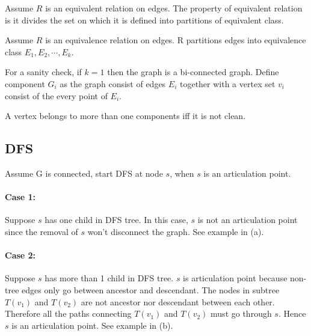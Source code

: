 \documentclass[en,hazy,blue,screen,14pt]{elegantnote}
\begin{document}
Assume $R$ is an equivalent relation on edges. The property of equivalent 
relation is it divides the set on which it is defined into partitions of 
equivalent class.

Assume $R$ is an equivalence relation on edges. R partitions edges into 
equivalence class $E_1, E_2, \cdots, E_k$. 

For a sanity check, if $k = 1$ then the graph is a bi-connected graph. 
Define component $G_i$ as the graph consist of edges $E_i$ together with a 
vertex set $v_i$ consist of the every point of $E_i$.

A vertex belongs to more than one components iff it is not clean.

\subsection{DFS }
Assume G is connected, start DFS at node $s$, when $s$ is an articulation point.

\paragraph{Case 1:} Suppose $s$ has one child in DFS tree. In this case, $s$ is 
not an articulation point since the removal of $s$ won't disconnect the graph. 
See example in (a).

\paragraph{Case 2:} Suppose $s$ has more than 1 child in DFS tree. $s$ is 
articulation point because non-tree edges only go between ancestor and 
descendant. The nodes in subtree $T(v_1)$ and $T(v_2)$ are not ancestor nor 
descendant between each other. Therefore all the paths connecting $T(v_1)$ and 
$T(v_2)$ must go through $s$. Hence $s$ is an articulation point. See example in 
(b).
\end{document}
